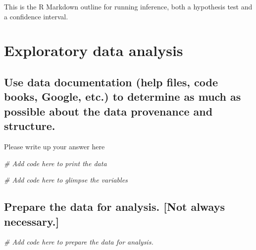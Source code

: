 \documentclass[
]{book}
\newenvironment{Shaded}{\begin{snugshade}}{\end{snugshade}}
\newcommand{\CommentTok}[1]{\textcolor[rgb]{0.56,0.35,0.01}{\textit{#1}}}
\begin{document}
This is the R Markdown outline for running inference, both a hypothesis test and a confidence interval.

\hypertarget{exploratory-data-analysis-2}{%
\section*{Exploratory data analysis}\label{exploratory-data-analysis-2}}

\hypertarget{use-data-documentation-help-files-code-books-google-etc.-to-determine-as-much-as-possible-about-the-data-provenance-and-structure.-2}{%
\subsection*{Use data documentation (help files, code books, Google, etc.) to determine as much as possible about the data provenance and structure.}\label{use-data-documentation-help-files-code-books-google-etc.-to-determine-as-much-as-possible-about-the-data-provenance-and-structure.-2}}

Please write up your answer here

\begin{Shaded}
\begin{Highlighting}[]
\CommentTok{\# Add code here to print the data}
\end{Highlighting}
\end{Shaded}

\begin{Shaded}
\begin{Highlighting}[]
\CommentTok{\# Add code here to glimpse the variables}
\end{Highlighting}
\end{Shaded}

\hypertarget{prepare-the-data-for-analysis.-not-always-necessary.-2}{%
\subsection*{Prepare the data for analysis. {[}Not always necessary.{]}}\label{prepare-the-data-for-analysis.-not-always-necessary.-2}}

\begin{Shaded}
\begin{Highlighting}[]
\CommentTok{\# Add code here to prepare the data for analysis.}
\end{Highlighting}
\end{Shaded}
\end{document}
